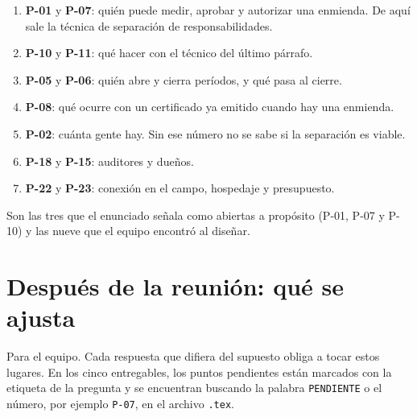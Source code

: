 \documentclass[11pt,letterpaper]{article}
\begin{document}
\begin{enumerate}[itemsep=1pt]
\item \textbf{P-01} y \textbf{P-07}: quién puede medir, aprobar y autorizar una enmienda. De aquí sale la
      técnica de separación de responsabilidades.
\item \textbf{P-10} y \textbf{P-11}: qué hacer con el técnico del último párrafo.
\item \textbf{P-05} y \textbf{P-06}: quién abre y cierra períodos, y qué pasa al cierre.
\item \textbf{P-08}: qué ocurre con un certificado ya emitido cuando hay una enmienda.
\item \textbf{P-02}: cuánta gente hay. Sin ese número no se sabe si la separación es viable.
\item \textbf{P-18} y \textbf{P-15}: auditores y dueños.
\item \textbf{P-22} y \textbf{P-23}: conexión en el campo, hospedaje y presupuesto.
\end{enumerate}

Son las tres que el enunciado señala como abiertas a propósito (P-01, P-07 y P-10) y las nueve que
el equipo encontró al diseñar.

\section{Después de la reunión: qué se ajusta}

Para el equipo. Cada respuesta que difiera del supuesto obliga a tocar estos lugares. En los cinco
entregables, los puntos pendientes están marcados con la etiqueta de la pregunta y se encuentran
buscando la palabra \texttt{PENDIENTE} o el número, por ejemplo \texttt{P-07}, en el archivo
\texttt{.tex}.
\end{document}

